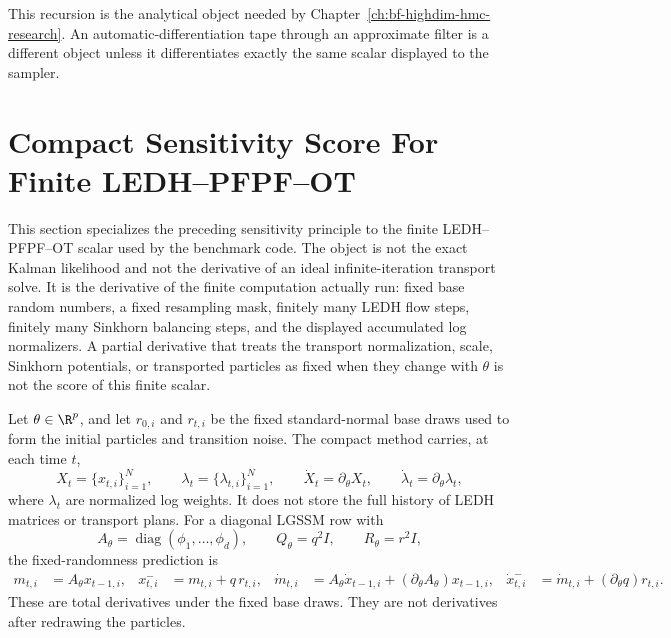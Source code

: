 This recursion is the analytical object needed by Chapter~\ref{ch:bf-highdim-hmc-research}.
An automatic-differentiation tape through an approximate filter is a different
object unless it differentiates exactly the same scalar displayed to the
sampler.

\section{Compact Sensitivity Score For Finite LEDH--PFPF--OT}
\label{sec:bf-hd-ledh-compact-sensitivity-score}

This section specializes the preceding sensitivity principle to the finite
LEDH--PFPF--OT scalar used by the benchmark code.  The object is not the exact
Kalman likelihood and not the derivative of an ideal infinite-iteration
transport solve.  It is the derivative of the finite computation actually run:
fixed base random numbers, a fixed resampling mask, finitely many LEDH flow
steps, finitely many Sinkhorn balancing steps, and the displayed accumulated
log normalizers.  A partial derivative that treats the transport
normalization, scale, Sinkhorn potentials, or transported particles as fixed
when they change with \(\theta\) is not the score of this finite scalar.

Let \(\theta\in\R^p\), and let \(r_{0,i}\) and \(r_{t,i}\) be the fixed
standard-normal base draws used to form the initial particles and transition
noise.  The compact method carries, at each time \(t\),
\[
  X_t=\{x_{t,i}\}_{i=1}^N,\qquad
  \lambda_t=\{\lambda_{t,i}\}_{i=1}^N,\qquad
  \dot X_t=\partial_\theta X_t,\qquad
  \dot\lambda_t=\partial_\theta \lambda_t,
\]
where \(\lambda_t\) are normalized log weights.  It does not store the full
history of LEDH matrices or transport plans.  For a diagonal LGSSM row with
\[
  A_\theta=\operatorname{diag}(\phi_1,\ldots,\phi_d),\qquad
  Q_\theta=q^2 I,\qquad
  R_\theta=r^2 I,
\]
the fixed-randomness prediction is
\begin{align}
  m_{t,i} &= A_\theta x_{t-1,i},&
  x^-_{t,i} &= m_{t,i}+q\,r_{t,i},&
  \dot m_{t,i} &= A_\theta\dot x_{t-1,i}
    +(\partial_\theta A_\theta)x_{t-1,i},&
  \dot x^-_{t,i} &= \dot m_{t,i}+(\partial_\theta q)r_{t,i}.
  \label{eq:bf-hd-ledh-compact-prediction-sensitivity}
\end{align}
These are total derivatives under the fixed base draws.  They are not
derivatives after redrawing the particles.

